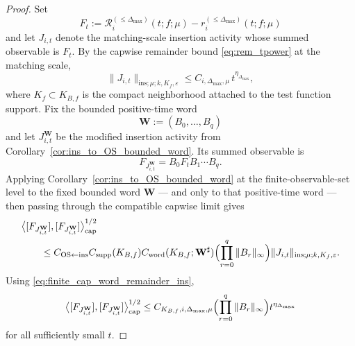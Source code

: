 \begin{proof}
Set
\[
F_t:=\mathcal R_i^{(\le \Delta_{\max})}(t;f;\mu)-r_i^{(\le \Delta_{\max})}(t;f;\mu)
\]
and let $J_{i,t}$ denote the matching-scale insertion activity whose summed observable is $F_t$.
By the capwise remainder bound \eqref{eq:rem_tpower} at the matching scale,
\begin{equation}\label{eq:finite_cap_word_remainder_ins}
\|J_{i,t}\|_{\mathrm{ins};\mu;k,K_f,\varepsilon}
\le
C_{i,\Delta_{\max},\mu}\,t^{\eta_{\Delta_{\max}}},
\end{equation}
where $K_f\subset K_{B,f}$ is the compact neighborhood attached to the test function support.
Fix the bounded positive-time word
\[
\mathbf W:=(B_0,\dots,B_q)
\]
and let $J_{i,t}^{\mathbf W}$ be the modified insertion activity from Corollary~\ref{cor:ins_to_OS_bounded_word}.
Its summed observable is
\[
F_{J_{i,t}^{\mathbf W}}=B_0F_tB_1\cdots B_q.
\]
Applying Corollary~\ref{cor:ins_to_OS_bounded_word} at the finite-observable-set level to the fixed bounded word $\mathbf W$ --- and only to that positive-time word --- then passing through the compatible capwise limit gives
\[
\begin{aligned}
&\big\langle [F_{J_{i,t}^{\mathbf W}}],[F_{J_{i,t}^{\mathbf W}}]\big\rangle_{\mathrm{cap}}^{1/2}\\
&\qquad\le
C_{\mathrm{OS}\leftarrow\mathrm{ins}}
C_{\mathrm{supp}}(K_{B,f})
C_{\mathrm{word}}(K_{B,f};\mathbf W^{\sharp})
\Bigl(\prod_{r=0}^q \|B_r\|_{\infty}\Bigr)
\|J_{i,t}\|_{\mathrm{ins};\mu;k,K_f,\varepsilon}.
\end{aligned}
\]
Using \eqref{eq:finite_cap_word_remainder_ins},
\begin{equation}\label{eq:finite_cap_word_remainder_os}
\big\langle [F_{J_{i,t}^{\mathbf W}}],[F_{J_{i,t}^{\mathbf W}}]\big\rangle_{\mathrm{cap}}^{1/2}
\le
C_{K_{B,f},i,\Delta_{\max},\mu}
\Bigl(\prod_{r=0}^q \|B_r\|_{\infty}\Bigr)
t^{\eta_{\Delta_{\max}}}
\end{equation}
for all sufficiently small $t$.


\end{proof}

